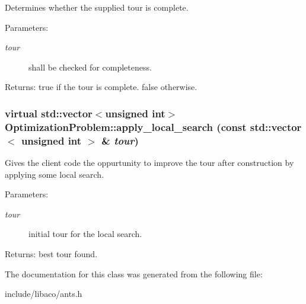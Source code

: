 Determines whether the supplied tour is complete. 

\begin{Desc}
\item[Parameters:]
\begin{description}
\item[{\em tour}]shall be checked for completeness. \end{description}
\end{Desc}
\begin{Desc}
\item[Returns:]true if the tour is complete. false otherwise. \end{Desc}
\hypertarget{classOptimizationProblem_74c083b6b88c801052af5dbfa06644e0}{
\subsubsection[apply\_\-local\_\-search]{\setlength{\rightskip}{0pt plus 5cm}virtual std::vector$<$unsigned int$>$ OptimizationProblem::apply\_\-local\_\-search (const std::vector$<$ unsigned int $>$ \& {\em tour})}}
\label{classOptimizationProblem_74c083b6b88c801052af5dbfa06644e0}


Gives the client code the oppurtunity to improve the tour after construction by applying some local search. 

\begin{Desc}
\item[Parameters:]
\begin{description}
\item[{\em tour}]initial tour for the local search. \end{description}
\end{Desc}
\begin{Desc}
\item[Returns:]best tour found. \end{Desc}


The documentation for this class was generated from the following file:\begin{CompactItemize}
\item 
include/libaco/ants.h\end{CompactItemize}
